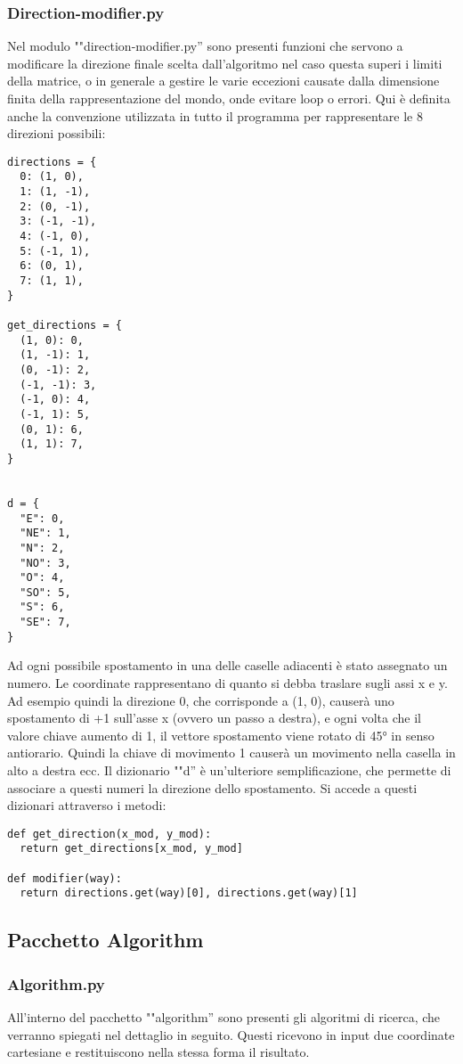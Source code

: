 \subsubsection{Direction-modifier.py}
Nel modulo ""direction-modifier.py'' sono presenti funzioni che servono a modificare la direzione finale scelta dall'algoritmo nel caso questa superi i limiti della matrice, o in generale a gestire le varie eccezioni causate dalla dimensione finita della rappresentazione del mondo, onde evitare loop o errori. Qui è definita anche la convenzione utilizzata in tutto il programma per rappresentare le 8 direzioni possibili:
\begin{verbatim}
directions = {
  0: (1, 0),
  1: (1, -1),
  2: (0, -1),
  3: (-1, -1),
  4: (-1, 0),
  5: (-1, 1),
  6: (0, 1),
  7: (1, 1),
}

get_directions = {
  (1, 0): 0,
  (1, -1): 1,
  (0, -1): 2,
  (-1, -1): 3,
  (-1, 0): 4,
  (-1, 1): 5,
  (0, 1): 6,
  (1, 1): 7,
}


d = {
  "E": 0,
  "NE": 1,
  "N": 2,
  "NO": 3,
  "O": 4,
  "SO": 5,
  "S": 6,
  "SE": 7,
}
\end{verbatim}

Ad ogni possibile spostamento in una delle caselle adiacenti è stato assegnato un numero. Le coordinate rappresentano di quanto si debba traslare sugli assi x e y. Ad esempio quindi la direzione 0, che corrisponde a (1, 0), causerà uno spostamento di +1 sull'asse x (ovvero un passo a destra), e ogni volta che il valore chiave aumento di 1, il vettore spostamento viene rotato di 45° in senso antiorario. Quindi la chiave di movimento 1 causerà un movimento nella casella in alto a destra ecc. Il dizionario ""d'' è un'ulteriore semplificazione, che permette di associare a questi numeri la direzione dello spostamento. Si accede a questi dizionari attraverso i metodi:
\begin{verbatim}
def get_direction(x_mod, y_mod):
  return get_directions[x_mod, y_mod]

def modifier(way):
  return directions.get(way)[0], directions.get(way)[1]

\end{verbatim}

\subsection{Pacchetto Algorithm}

\subsubsection{Algorithm.py}
All'interno del pacchetto ""algorithm'' sono presenti gli algoritmi di ricerca, che verranno spiegati nel dettaglio in seguito. Questi ricevono in input due coordinate cartesiane e restituiscono nella stessa forma il risultato.
	
